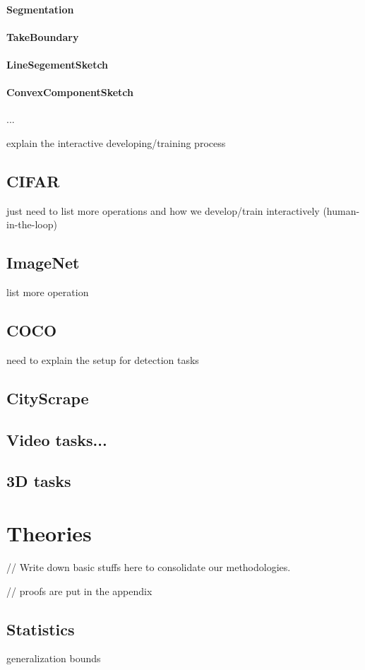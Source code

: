 \documentclass[10pt, oneside]{article}   	%
\theoremstyle{definition}
\begin{document}
\paragraph{Segmentation}
\paragraph{TakeBoundary}
\paragraph{LineSegementSketch}
\paragraph{ConvexComponentSketch}

...

explain the interactive developing/training process
\subsection{CIFAR}
just need to list more operations and how we develop/train interactively (human-in-the-loop)
\subsection{ImageNet}list more operation
\subsection{COCO}
need to explain the setup for detection tasks
\subsection{CityScrape}
\subsection{Video tasks...}
\subsection{3D tasks}
\section{Theories}
// Write down basic stuffs here to consolidate our methodologies.

// proofs are put in the appendix
\subsection{Statistics}
generalization bounds
\end{document}

